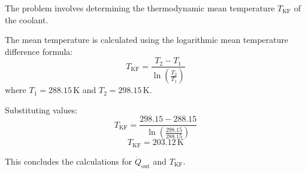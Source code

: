 The problem involves determining the thermodynamic mean temperature \( T_{\text{KF}} \) of the coolant.  

The mean temperature is calculated using the logarithmic mean temperature difference formula:  
\[
T_{\text{KF}} = \frac{T_2 - T_1}{\ln\left(\frac{T_2}{T_1}\right)}
\]  
where \( T_1 = 288.15 \, \text{K} \) and \( T_2 = 298.15 \, \text{K} \).  

Substituting values:  
\[
T_{\text{KF}} = \frac{298.15 - 288.15}{\ln\left(\frac{298.15}{288.15}\right)}
\]  
\[
T_{\text{KF}} = 203.12 \, \text{K}
\]  

This concludes the calculations for \( \dot{Q}_{\text{out}} \) and \( T_{\text{KF}} \).